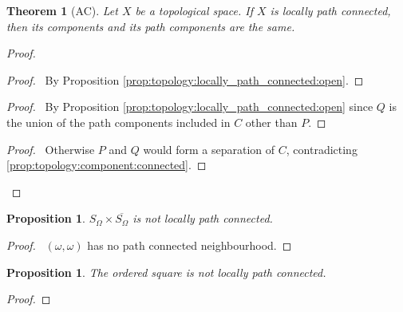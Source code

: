 \documentclass{report}
\let\qed\relax
\newtheorem{prop}[lm]{Proposition}
\newtheorem{thm}[lm]{Theorem}
\theoremstyle{definition}
\begin{document}
  \begin{thm}[AC]
    Let $X$ be a topological space. If $X$ is locally path connected, then its
    components and its path components are the same.
  \end{thm}

  \begin{proof}
    \pf
    \begin{proof}
      \pf\ By Proposition \ref{prop:topology:locally_path_connected:open}.
    \end{proof}
    \begin{proof}
      \pf\ By Proposition \ref{prop:topology:locally_path_connected:open} since
      $Q$ is the union of the path components included in $C$ other than $P$.
    \end{proof}
    \begin{proof}
      \pf\ Otherwise $P$ and $Q$ would form a separation of $C$, contradicting
      \ref{prop:topology:component:connected}.
    \end{proof}
    \qed
  \end{proof}

   \begin{prop}
   $S_\Omega \times \overline{S_\Omega}$ is not locally path connected.
 \end{prop}

 \begin{proof}
  \pf\ $(\omega, \omega)$ has no path connected neighbourhood. \qed
 \end{proof}

 \begin{prop}
  The ordered square is not locally path connected.
 \end{prop}

 \begin{proof}
  \pf
  \qed
 \end{proof}
\end{document}
